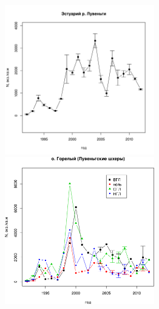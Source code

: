 	\begin{figure}[p]

	\begin{minipage}[b]{.46\linewidth}
	\begin{center}
		\includegraphics[width=65mm]{../White_Sea/Estuatiy_Luvenga/N2_dynamic1.pdf}
	\end{center}
	\end{minipage}
%
	\hfil %
%
	\begin{minipage}[b]{.46\linewidth}
	\begin{center}
		\includegraphics[width=65mm]{../White_Sea/Luvenga_Goreliy/N2_dynamic1.pdf}
	\end{center}
	\end{minipage}
	\begin{minipage}[b]{.46\linewidth}
	\begin{center}

\end{center}
\end{minipage}
\end{figure}
